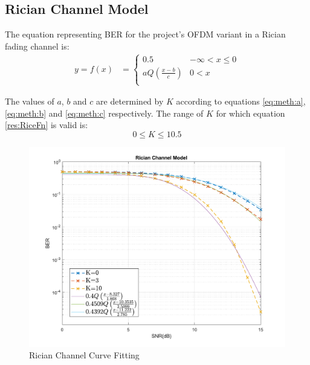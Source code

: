 \subsection{Rician Channel Model}
The equation representing BER for the project's OFDM variant in a Rician fading channel is:
\begin{align}
	\label{res:RiceFn}
	y = f(x) &=
	\begin{cases}
		0.5 & -\infty < x \leq 0 \\
		aQ \left(\frac{x - b}{c}\right) & 0 < x \\
	\end{cases}
\end{align}
\begin{mathDef}
\end{mathDef}
The values of \(a\), \(b\) and \(c\) are determined by \(K\) according to equations \eqref{eq:meth:a}, \eqref{eq:meth:b} and \eqref{eq:meth:c} respectively.
The range of \(K\) for which equation \eqref{res:RiceFn} is valid is:
\begin{equation}
	0 \leq K \leq 10.5
\end{equation}
\begin{figure}[htpb!]
    \centering
    \includegraphics[scale=0.56]{Graphics/Methodology/RiceCurveFit.pdf}
    \caption{Rician Channel Curve Fitting}
	\label{fig:riceCurveFit}
\end{figure}


\pagebreak


